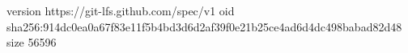 version https://git-lfs.github.com/spec/v1
oid sha256:914dc0ea0a67f83e11f5b4bd3d6d2af39f0e21b25ce4ad6d4dc498babad82d48
size 56596
